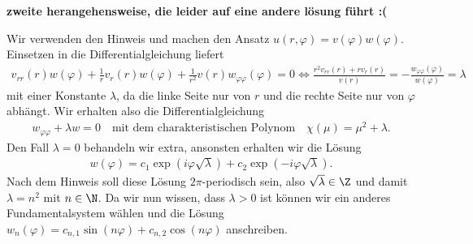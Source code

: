 
\textbf{zweite herangehensweise, die leider auf eine andere lösung führt :(}

\begin{solution}
	Wir verwenden den Hinweis und machen den Ansatz $u(r, \varphi) = v(\varphi) w(\varphi)$. Einsetzen in die Differentialgleichung liefert
	\begin{align*}
	v_{rr}(r)w(\varphi) + \frac{1}{r} v_r(r)w(\varphi) + \frac{1}{r^2} v(r)w_{\varphi\varphi}(\varphi) = 0 \Leftrightarrow \frac{r^2v_{rr}(r) + rv_r(r)}{v(r)} = -\frac{w_{\varphi\varphi}(\varphi)}{w(\varphi)} = \lambda
	\end{align*}
	mit einer Konstante $\lambda$, da die linke Seite nur von $r$ und die rechte Seite nur von $\varphi$ abhängt. Wir erhalten also die Differentialgleichung 
	\begin{align*}
	w_{\varphi\varphi} + \lambda w = 0 \quad \text{mit dem charakteristischen Polynom} \quad \chi(\mu) = \mu^2 + \lambda.
	\end{align*}
	Den Fall $\lambda = 0$ behandeln wir extra, ansonsten erhalten wir die Lösung 
	\begin{align*}
	w(\varphi) = c_1 \exp\left(i \varphi \sqrt{\lambda} \right) + c_2 \exp\left(-i \varphi \sqrt{\lambda} \right).
	\end{align*}
	Nach dem Hinweis soll diese Lösung $2\pi$-periodisch sein, also $\sqrt{\lambda} \in \Z$ und damit $\lambda = n^2$ mit $n \in \N$. Da wir nun wissen, dass $\lambda > 0$ ist können wir ein anderes Fundamentalsystem wählen und die Lösung $w_n(\varphi) = c_{n,1} \sin(n\varphi) + c_{n,2} \cos(n\varphi)$ anschreiben.
	

\end{solution}
